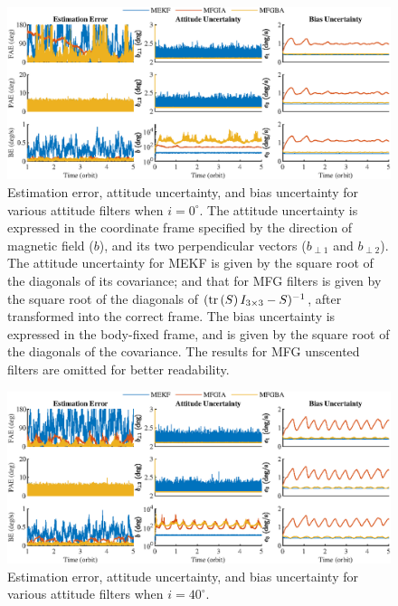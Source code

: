 \begin{figure}
	\centering
	\includegraphics[scale=0.97]{figures/attEst-sim3-error-i0}
	\caption{Estimation error, attitude uncertainty, and bias uncertainty for various attitude filters when $i=0^\circ$.
		The attitude uncertainty is expressed in the coordinate frame specified by the direction of magnetic field ($b$), and its two perpendicular vectors ($b_{\perp 1}$ and $b_{\perp 2}$).
		The attitude uncertainty for MEKF is given by the square root of the diagonals of its covariance; and that for MFG filters is given by the square root of the diagonals of $(\mathrm{tr}\left( S \right)I_{3\times 3}-S)^{-1}$, after transformed into the correct frame.
		The bias uncertainty is expressed in the body-fixed frame, and is given by the square root of the diagonals of the covariance.
		The results for MFG unscented filters are omitted for better readability.}
	\label{fig:attEst-sim3-error-i0}
\end{figure}

\begin{figure}
	\centering
	\includegraphics[scale=0.97]{figures/attEst-sim3-error-i40}
	\caption{Estimation error, attitude uncertainty, and bias uncertainty for various attitude filters when $i=40^\circ$.}
	\label{fig:attEst-sim3-error-i40}
\end{figure}

